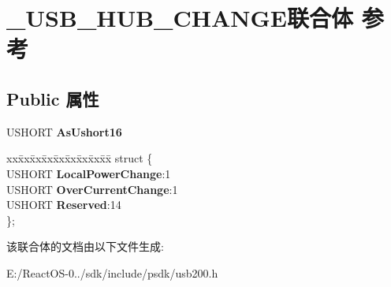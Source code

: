 \hypertarget{union___u_s_b___h_u_b___c_h_a_n_g_e}{}\section{\+\_\+\+U\+S\+B\+\_\+\+H\+U\+B\+\_\+\+C\+H\+A\+N\+G\+E联合体 参考}
\label{union___u_s_b___h_u_b___c_h_a_n_g_e}
\subsection*{Public 属性}
\begin{DoxyCompactItemize}
\item 
\mbox{\label{union___u_s_b___h_u_b___c_h_a_n_g_e_adcbf49cd2919268c3e6e3b752ee5586a}} 
U\+S\+H\+O\+RT {\bfseries As\+Ushort16}
\item 
\mbox{\label{union___u_s_b___h_u_b___c_h_a_n_g_e_a234ccbe86162992a33668b5c21d201b7}} 
\begin{tabbing}
xx\=xx\=xx\=xx\=xx\=xx\=xx\=xx\=xx\=\kill
struct \{\\
\>USHORT {\bfseries LocalPowerChange}:1\\
\>USHORT {\bfseries OverCurrentChange}:1\\
\>USHORT {\bfseries Reserved}:14\\
\}; \\

\end{tabbing}\end{DoxyCompactItemize}


该联合体的文档由以下文件生成\+:\begin{DoxyCompactItemize}
\item 
E\+:/\+React\+O\+S-\/0../sdk/include/psdk/usb200.\+h\end{DoxyCompactItemize}
